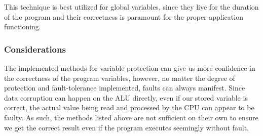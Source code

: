 This technique is best utilized for global variables, since they live for the duration of the program and their correctness is paramount for the proper application functioning.

\subsubsection{Considerations}

The implemented methods for variable protection can give us more confidence in the correctness of the program variables, however, no matter the degree of protection and fault-tolerance implemented, faults can always manifest. Since data corruption can happen on the ALU directly, even if our stored variable is correct, the actual value being read and processed by the CPU can appear to be faulty. As such, the methods listed above are not sufficient on their own to ensure we get the correct result even if the program executes seemingly without fault.
